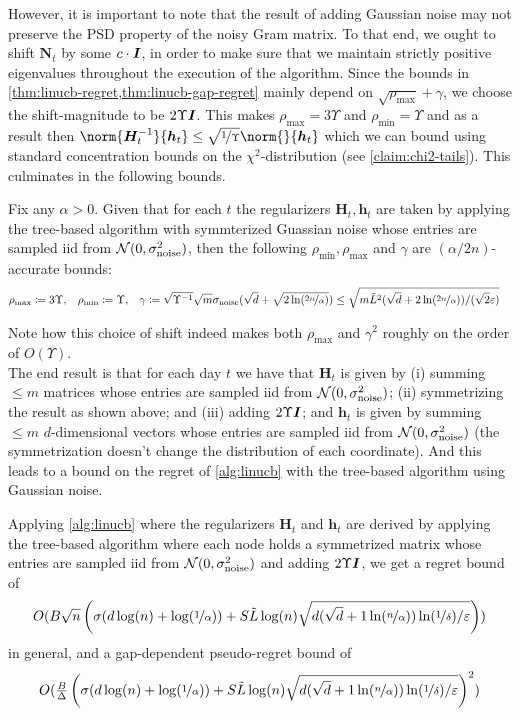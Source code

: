 \documentclass{article}
\renewcommand{\vec}[1]{\bm{#1}}
\newcommand{\defeq}{\coloneq}
\newcommand{\inv}[1]{#1^{-1}}
\newcommand{\Normal}{\mathcal{N}}
\newcommand{\Eye}[1][]{\bm{I}\notblank{#1}{_{{#1}\times{#1}}}{}}
\begin{document}
However, it is important to note that the result of adding Gaussian
noise may not preserve the PSD property of the noisy Gram matrix. To
that end, we ought to shift $\vec N_t$ by some $c\cdot \Eye$, in order
to make sure that we maintain strictly positive eigenvalues throughout
the execution of the algorithm. Since the bounds in \cref{thm:linucb-regret,thm:linucb-gap-regret} mainly depend on $\sqrt{\rho_{\max}} +\gamma$, we choose the shift-magnitude to be $2\Upsilon \Eye$. This makes $\rho_{\max}=3\Upsilon$ and $\rho_{\min}=\Upsilon$ and as a result then
$\norm{\inv{\vec H_t}}{\vec h_t} \leq \sqrt{\nicefrac 1 \Upsilon}\norm{}{\vec h_t}$ which we can
bound using standard concentration bounds on the $\chi^2$-distribution
(see \cref{claim:chi2-tails}). This culminates in the following
bounds.
\begin{proposition}
\label{pro:accurate_bounds_for_Gaussian}
Fix any $\alpha>0$. Given that for each $t$ the regularizers $\vec H_t, \vec h_t$ are taken by applying the tree-based algorithm with symmterized Guassian noise whose entries are sampled iid from $\Normal(0, \sigma_{\rm noise}^2)$, then the following $\rho_{\min},\rho_{\max}$ and $\gamma$ are $(\alpha/2n)$-accurate bounds:
\begin{align*}
    &\rho_{\max}\defeq  3\Upsilon, &&\rho_{\min}\defeq \Upsilon, && \gamma \defeq \sqrt{\inv{\Upsilon}}\sqrt m\sigma_{\rm noise}(\sqrt d + \sqrt{2\ln(\nicefrac{2n}\alpha)})\leq\sqrt{ {m\tilde L^2(\sqrt d+2\ln(\nicefrac {2n}{\alpha}))} /({\sqrt 2 \varepsilon}) }
  \end{align*}
\end{proposition}
Note how this choice of shift indeed makes both $\rho_{\max}$ and $\gamma^2$ roughly on the order of $O(\Upsilon)$.\\
The end result is that for each day
$t$ we have that $\vec H_t$ is given by (i) summing $\leq m$ matrices
whose entries are sampled iid from $\Normal(0,\sigma_{\rm noise}^2)$;
(ii) symmetrizing the result as shown above; and (iii) adding
$2\Upsilon\Eye$; and $\vec h_t$ is given by summing $\leq m$
$d$-dimensional vectors whose entries are sampled iid from
$\Normal(0,\sigma_{\rm noise}^2)$ (the symmetrization doesn't change
the distribution of each coordinate). And this leads to a bound on the regret of \cref{alg:linucb} with the tree-based algorithm using Gaussian noise.
\begin{corollary}
\label{cor:regret_with_Gaussian}
Applying \cref{alg:linucb} where the regularizers $\vec H_t$ and $\vec h_t$ are derived by applying the tree-based algorithm where each node holds a symmetrized matrix whose entries are sampled iid from $\Normal(0,\sigma_{\rm noise}^2)$ and adding $2\Upsilon\Eye$, we get a regret bound of
\[O(B\sqrt n \left(  
\sigma (d \log(n)+\log(\nicefrac 1 \alpha)) + S\tilde L \log(n) \sqrt{
{d(\sqrt d + 1\ln(\nicefrac {n}{\alpha}))\ln(\nicefrac 1 \delta)}/{\varepsilon}
}
\right) )\]
in general, and a gap-dependent pseudo-regret bound of
\[O(\tfrac B \Delta \left(  
\sigma (d \log(n)+\log(\nicefrac 1 \alpha)) + S\tilde L \log(n) \sqrt{
{d(\sqrt d + 1\ln(\nicefrac {n}{\alpha}))\ln(\nicefrac 1 \delta)}/{\varepsilon}
}
\right)^2 )\]
\end{corollary}
\end{document}
